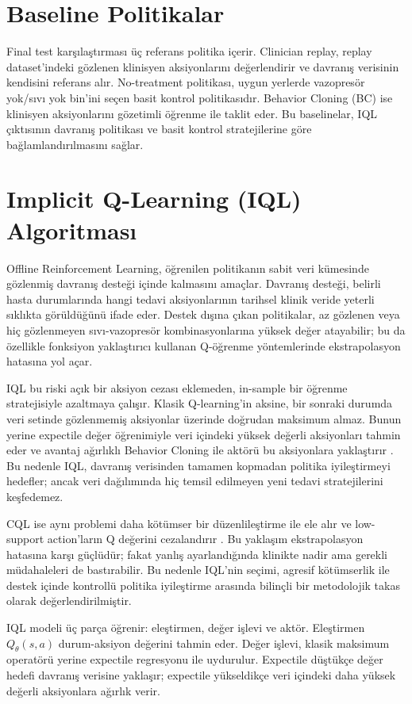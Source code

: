 \documentclass[conference]{IEEEtran}
\begin{document}
\section{Baseline Politikalar}
Final test karşılaştırması üç referans politika içerir. Clinician replay, replay dataset'indeki gözlenen klinisyen aksiyonlarını değerlendirir ve davranış verisinin kendisini referans alır. No-treatment politikası, uygun yerlerde vazopresör yok/sıvı yok bin'ini seçen basit kontrol politikasıdır. Behavior Cloning (BC) ise klinisyen aksiyonlarını gözetimli öğrenme ile taklit eder. Bu baselinelar, IQL çıktısının davranış politikası ve basit kontrol stratejilerine göre bağlamlandırılmasını sağlar.

\section{Implicit Q-Learning (IQL) Algoritması}
Offline Reinforcement Learning, öğrenilen politikanın sabit veri kümesinde gözlenmiş davranış desteği içinde kalmasını amaçlar. Davranış desteği, belirli hasta durumlarında hangi tedavi aksiyonlarının tarihsel klinik veride yeterli sıklıkta görüldüğünü ifade eder. Destek dışına çıkan politikalar, az gözlenen veya hiç gözlenmeyen sıvı-vazopresör kombinasyonlarına yüksek değer atayabilir; bu da özellikle fonksiyon yaklaştırıcı kullanan Q-öğrenme yöntemlerinde ekstrapolasyon hatasına yol açar.

IQL bu riski açık bir aksiyon cezası eklemeden, in-sample bir öğrenme stratejisiyle azaltmaya çalışır. Klasik Q-learning'in aksine, bir sonraki durumda veri setinde gözlenmemiş aksiyonlar üzerinde doğrudan maksimum almaz. Bunun yerine expectile değer öğrenimiyle veri içindeki yüksek değerli aksiyonları tahmin eder ve avantaj ağırlıklı Behavior Cloning ile aktörü bu aksiyonlara yaklaştırır \cite{iql}. Bu nedenle IQL, davranış verisinden tamamen kopmadan politika iyileştirmeyi hedefler; ancak veri dağılımında hiç temsil edilmeyen yeni tedavi stratejilerini keşfedemez.

CQL ise aynı problemi daha kötümser bir düzenlileştirme ile ele alır ve low-support action'ların Q değerini cezalandırır \cite{cql}. Bu yaklaşım ekstrapolasyon hatasına karşı güçlüdür; fakat yanlış ayarlandığında klinikte nadir ama gerekli müdahaleleri de bastırabilir. Bu nedenle IQL'nin seçimi, agresif kötümserlik ile destek içinde kontrollü politika iyileştirme arasında bilinçli bir metodolojik takas olarak değerlendirilmiştir.

IQL modeli üç parça öğrenir: eleştirmen, değer işlevi ve aktör. Eleştirmen $Q_\theta(s,a)$ durum-aksiyon değerini tahmin eder. Değer işlevi, klasik maksimum operatörü yerine expectile regresyonu ile uydurulur. Expectile düştükçe değer hedefi davranış verisine yaklaşır; expectile yükseldikçe veri içindeki daha yüksek değerli aksiyonlara ağırlık verir.
\end{document}
